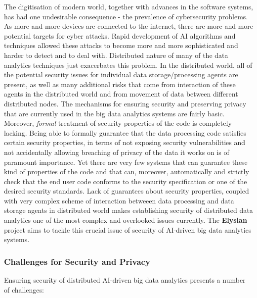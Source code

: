 \documentclass[a4paper,11pt]{article}
\newcommand{\project}[1]{\textbf{#1}\xspace}
\newcommand{\SECURITY}{\project{Elysian}}
\newcommand{\TheProject}{\SECURITY}
\begin{document}
The digitisation of modern world, together with advances in the software systems, has had one undesirable consequence - the prevalence of cybersecurity problems. As more and more devices are connected to the internet, there are more and more potential targets for cyber attacks. Rapid development of AI algorithms and techniques allowed these attacks to become more and more sophisticated and harder to detect and to deal with. Distributed nature of many of the data analytics techniques just exacerbates this problem. In the distributed world, all of the potential security issues for individual data storage/processing agents are present, as well as many additional risks that come from interaction of these agents in the distributed world and from movement of data between different distributed nodes. The mechanisms for ensuring security and preserving privacy that are currently used in the big data analytics systems are fairly basic. Moreover, \emph{formal} treatment of security properties of the code is completely lacking. Being able to formally guarantee that the data processing code satisfies certain security properties, in terms of not exposing security vulnerabilities and not accidentally allowing breaching of privacy of the data it works on is of paramount importance. Yet there are very few systems that can guarantee these kind of properties of the code and that can, moreover, automatically and strictly check that the end user code conforms to the security specification or one of the desired security standards. Lack of guarantees about security properties, coupled with very complex scheme of interaction betweeen data processing and data storage agents in distributed world makes establishing security of distributed data analytics one of the most complex and overlooked issues currently. The \TheProject{} project aims to tackle this crucial issue of security of AI-driven big data analytics systems.




\subsubsection{Challenges for Security and Privacy}

Ensuring security of distributed AI-driven big data analytics presents a number of challenges:
\end{document}
